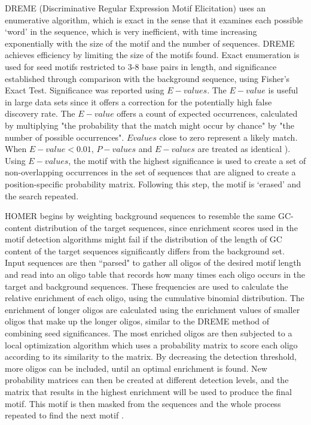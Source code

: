 \documentclass[12pt]{article}
\begin{document}
DREME (Discriminative Regular Expression Motif Elicitation) \citep{bailey2011dreme} uses an enumerative algorithm, which is exact in the sense that it examines each possible `word' in the sequence, which is very inefficient, with time increasing exponentially with the size of the motif and the number of sequences. DREME achieves efficiency by limiting the size of the motifs found. Exact enumeration is used for seed motifs restricted to 3-8 base pairs in length, and significance established through comparison with the background sequence, using Fisher's Exact Test. Significance was reported using $E-values$. The $E-value$ is useful in large data sets since it offers a correction for the potentially high false discovery rate. The $E-value$ offers a count of expected occurrences, calculated by multiplying "the probability that the match might occur by chance"  by "the number of possible occurrences". $Evalues$ close to zero represent a likely match. When $E-value < 0.01$, $P-values$ and $E-values$ are treated as identical \citep{Altschul}). Using $E-values$, the motif with the highest significance is used to create a set of non-overlapping occurrences in the set of sequences that are aligned to create a position-specific probability matrix. Following this step, the motif is `erased' and the search repeated.
 
HOMER \citep{heinz2010simple} begins by weighting background sequences to resemble the same GC-content distribution of the target sequences, since enrichment scores used in the motif detection algorithms might fail if the distribution of the length of GC content of the target sequences significantly
differs from the background set. Input sequences are then ``parsed" to gather all oligos of the desired motif length and read into an oligo table that records how many times each oligo occurs in the target and background sequences. These frequencies are used to calculate the relative enrichment of each oligo, using the cumulative binomial distribution. The enrichment of longer oligos are calculated using the enrichment values of smaller oligos that make up the longer oligos, similar to the DREME method of combining seed significances. The most enriched oligos are then subjected to a local optimization algorithm which uses a probability matrix to score each oligo according to its similarity to the matrix. By decreasing the detection threshold, more oligos can be included, until an optimal enrichment is found. New probability matrices can then be created at different detection levels, and the matrix that results in the highest enrichment will be used to produce the final motif. This motif is then masked from the sequences and the whole process repeated to find the next motif \citep{homer_ws}.
\end{document}
